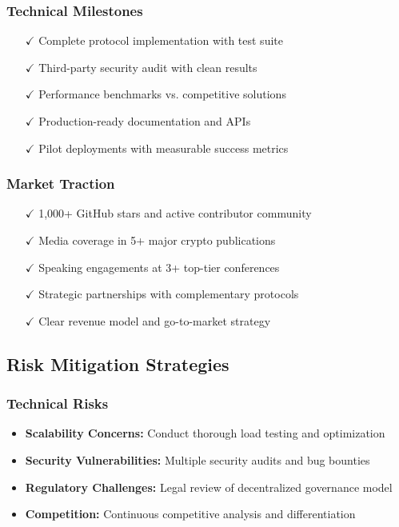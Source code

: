 \documentclass[12pt,a4paper]{article}
\begin{document}
\subsubsection{Technical Milestones}
\begin{itemize}
    \item[\(\checkmark\)] Complete protocol implementation with test suite
    \item[\(\checkmark\)] Third-party security audit with clean results
    \item[\(\checkmark\)] Performance benchmarks vs. competitive solutions
    \item[\(\checkmark\)] Production-ready documentation and APIs
    \item[\(\checkmark\)] Pilot deployments with measurable success metrics
\end{itemize}

\subsubsection{Market Traction}
\begin{itemize}
    \item[\(\checkmark\)] 1,000+ GitHub stars and active contributor community
    \item[\(\checkmark\)] Media coverage in 5+ major crypto publications
    \item[\(\checkmark\)] Speaking engagements at 3+ top-tier conferences
    \item[\(\checkmark\)] Strategic partnerships with complementary protocols
    \item[\(\checkmark\)] Clear revenue model and go-to-market strategy
\end{itemize}

\subsection{Risk Mitigation Strategies}

\subsubsection{Technical Risks}
\begin{itemize}
    \item \textbf{Scalability Concerns:} Conduct thorough load testing and optimization
    \item \textbf{Security Vulnerabilities:} Multiple security audits and bug bounties
    \item \textbf{Regulatory Challenges:} Legal review of decentralized governance model
    \item \textbf{Competition:} Continuous competitive analysis and differentiation
\end{itemize}
\end{document}
